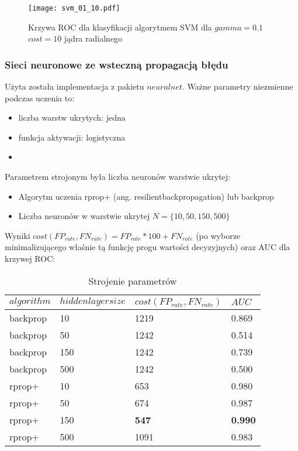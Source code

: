 \documentclass[fleqn]{article}
\begin{document}
\begin{figure}[H]
\centering
\texttt{[image: svm\_01\_10.pdf]}
\caption{Krzywa ROC dla klasyfikacji algorytmem SVM dla $gamma = 0.1$
$cost  = 10$ jądra radialnego \label{overflow}}
\label{fig:picture}
\end{figure}







\subsubsection{Sieci neuronowe ze wsteczną propagacją błędu}
Użyta została implementacja z pakietu $neuralnet$.
Ważne parametry niezmienne podczas uczenia to:
\begin{itemize}
    \item liczba warstw ukrytych: jedna
    \item funkcja aktywacji: logistyczna
    \item 
\end{itemize}

Parametrem strojonym była liczba neuronów warstwie ukrytej:
\begin{itemize}
  \item Algorytm uczenia rprop+ (ang. resilientbackpropagation) lub backprop
  \item Liczba neuronów w warstwie ukrytej $N = \{ 10, 50, 150, 500 \}$
\end{itemize}

Wyniki $cost(FP_{rate}, FN_{rate}) = FP_{rate} * 100 + FN_{rate}$ (po wyborze minimalizującego właśnie tą funkcję progu wartości decyzyjnych) oraz AUC dla krzywej ROC:

\begin{table}[h!]
  \centering
  \label{tab:table1}
  \begin{tabular}{l|l||l|l}
    $algorithm$ & $hidden layer size$ & $cost(FP_{rate}, FN_{rate})$  & $AUC$\\
    \hline
    backprop &  10 & 1219 & 0.869 \\
    backprop &  50 & 1242 & 0.514 \\
    backprop & 150 & 1242 & 0.739 \\
    backprop & 500 & 1242 & 0.500 \\
      rprop+ &  10 &  653 & 0.980 \\
      rprop+ &  50 &  674 & 0.987 \\
      rprop+ & 150 &  \textbf{547} & \textbf{0.990} \\
      rprop+ & 500 & 1091 & 0.983 \\
  \end{tabular}
  \caption{Strojenie parametrów}
\end{table}
\end{document}
